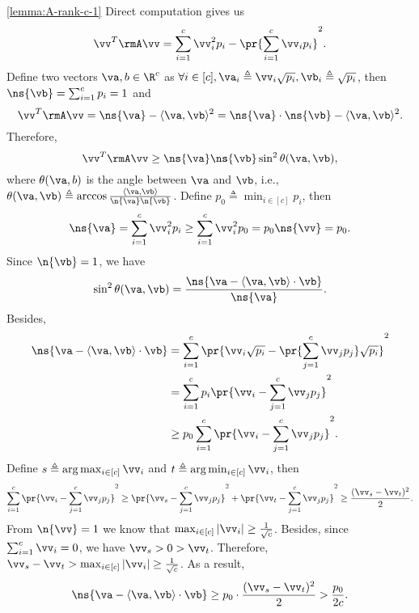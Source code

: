 \begin{proofof}{\cref{lemma:A-rank-c-1}}
Direct computation gives us
\begin{equation}
\vv^T\rmA\vv = \sum_{i=1}^c\vv_i^2p_i-\pr{\sum_{i=1}^c\vv_ip_i}^2.
\end{equation}
Define two vectors $\va,b\in\R^c$ as $\forall i\in[c], \va_i\triangleq \vv_i\sqrt{p_i}, \vb_i\triangleq\sqrt{p_i}$, then $\ns{\vb}=\sum_{i=1}^cp_i=1$ and
\begin{equation}
\vv^T\rmA\vv = \ns{\va}-\langle\va,\vb\rangle^2 = \ns{\va}\cdot\ns{\vb}-\langle \va,\vb\rangle^2.
\end{equation}
Therefore,
\begin{equation}
\vv^T\rmA\vv \geq \ns{\va}\ns{\vb}\sin^2\theta(\va,\vb),
\end{equation}
where $\theta(\va,b)$ is the angle between $\va$ and $\vb$, i.e., $\theta(\va,\vb)\triangleq\arccos\frac{\langle \va,\vb\rangle}{\n{\va}\n{\vb}}$.
Define $p_0\triangleq\min_{i\in[c]}p_i$, then
\begin{equation}
\ns{\va} = \sum_{i=1}^c\vv_i^2p_i \geq \sum_{i=1}^c\vv_i^2p_0 = p_0\ns{\vv} = p_0.
\end{equation}
Since $\n{\vb}=1$, we have
\begin{equation}
\sin^2\theta(\va,\vb) = \frac{\ns{\va-\langle \va,\vb\rangle\cdot \vb}}{\ns{\va}}.
\end{equation}
Besides,
\begin{equation}\begin{split}
\ns{\va-\langle \va,\vb\rangle\cdot \vb} &= \sum_{i=1}^c\pr{\vv_i\sqrt{p_i}-\pr{\sum_{j=1}^c\vv_jp_j}\sqrt{p_i}}^2\\
                                 &= \sum_{i=1}^cp_i\pr{\vv_i-\sum_{j=1}^c\vv_jp_j}^2\\
                                 &\geq p_0\sum_{i=1}^c\pr{\vv_i-\sum_{j=1}^c\vv_jp_j}^2.
\end{split}\end{equation}
Define $s\triangleq\arg\max_{i\in[c]}{\vv_i}$ and $t\triangleq\arg\min_{i\in[c]}{\vv_i}$, then
\begin{equation}
\sum_{i=1}^c\pr{\vv_i-\sum_{j=1}^c\vv_jp_j}^2\geq \pr{\vv_s-\sum_{j=1}^c\vv_jp_j}^2 + \pr{\vv_t-\sum_{j=1}^c\vv_jp_j}^2 \geq \frac{(\vv_s-\vv_t)^2}{2}.
\end{equation}
From $\n{\vv}=1$ we know that $\max_{i\in[c]}|\vv_i|\geq\frac{1}{\sqrt{c}}$. Besides, since $\sum_{i=1}^c\vv_i=0$, we have $\vv_s>0>\vv_t$. Therefore, $\vv_s-\vv_t>\max_{i\in[c]}|\vv_i|\geq\frac{1}{\sqrt{c}}$. As a result,
\begin{equation}
\ns{\va-\langle \va,\vb\rangle\cdot \vb} \geq p_0\cdot \frac{(\vv_s-\vv_t)^2}{2} > \frac{p_0}{2c}.

\end{equation}
\end{proofof}
